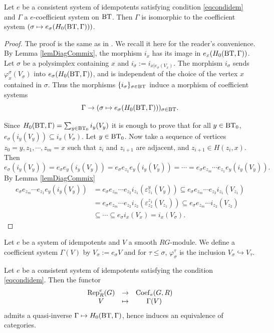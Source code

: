 \documentclass[a4paper,10pt]{amsart}
\begin{document}
\begin{The}
\label{theEsssurj}
Let $e$ be a consistent system of idempotents satisfying condition \eqref{eqcondidem} and $\Gamma$ a $e$-coefficient system on $\bt$. Then $\Gamma$ is isomorphic to the coefficient system $(\sigma \mapsto e_\sigma(H_0(\bt,\Gamma)))$.
\end{The}

\begin{proof}
	The proof is the same as in \cite[Section 2.4]{Wanga}. We recall it here for the reader's convenience. By Lemma \ref{lemDiagCommix}, the morphism $i_x$ has its image in $e_x(H_0(\bt,\Gamma))$. Let $\sigma$ be a polysimplex containing $x$ and $i_\sigma:=i_{x|e_\sigma(V_x)}$. The morphism $i_\sigma$ sends $\varphi^{\sigma}_x(V_\sigma)$ into $e_\sigma(H_0(\bt,\Gamma))$, and is independent of the choice of the vertex $x$ contained in $\sigma$. Thus the morphisms $\{i_\sigma\}_{\sigma \in \bt}$ induce a morphism of coefficient systems
	\[
		\Gamma \to (\sigma \mapsto e_\sigma(H_0(\bt,\Gamma)))_{\sigma \in \bt}.
	\]

	Since $H_0(\bt,\Gamma)= \sum_{y \in \bts} i_y(V_y)$ it is enough to prove that for all $y\in \bts$, $e_\sigma(i_y(V_y)) \subseteq i_x(V_\sigma)$. Let $y \in \bts$. Now take a sequence of vertices $z_0=y, z_1, \cdots, z_m=x$ such that $z_i$ and $z_{i+1}$ are adjacent, and $z_{i+1} \in H(z_i,x)$. Then
	\[
		e_\sigma(i_y(V_y)) = e_\sigma e_y(i_y(V_y)) = e_\sigma e_{z_1}e_y(i_y(V_y)) = \cdots = e_\sigma e_{z_m} \cdots e_{z_1}e_y(i_y(V_y)).
	\]
	By Lemma \ref{lemDiagCommix}
	\begin{align*}
		e_\sigma e_{z_m} \cdots e_{z_1}e_y(i_y(V_y)) &= e_\sigma e_{z_m} \cdots e_{z_2}i_{z_1}(\varepsilon_{z_1}^{y}(V_y)) \subseteq e_\sigma e_{z_m} \cdots e_{z_2}i_{z_1}(V_{z_1}) \\
		&= e_\sigma e_{z_m} \cdots e_{z_2}i_{z_2}(\varepsilon_{z_2}^{z_1}(V_{z_1})) \subseteq e_\sigma e_{z_m} \cdots i_{z_2}(V_{z_2}) \\
		&\subseteq \cdots \subseteq e_\sigma i_x(V_x) = i_x(V_\sigma).
	\end{align*}
\end{proof}


Let $e$ be a system of idempotents and $V$ a smooth $RG$-module. We define a coefficient system $\Gamma(V)$ by $V_\sigma:=e_\sigma V$ and for $\tau \leq \sigma$, $\varphi_{\sigma}^{\tau}$ is the inclusion $V_\sigma \hookrightarrow V_\tau$.

\begin{The}
\label{theeqcat}
Let $e$ be a consistent system of idempotents satisfying the condition \eqref{eqcondidem}. Then the functor
\[\begin{array}{ccc}
 \rep[R][e]{G} & \to & \coef \\
 V & \mapsto & \Gamma(V) \\
\end{array}\]
admits a quasi-inverse $\Gamma \mapsto H_0(\bt,\Gamma)$, hence induces an equivalence of categories.
\end{The}
\end{document}
